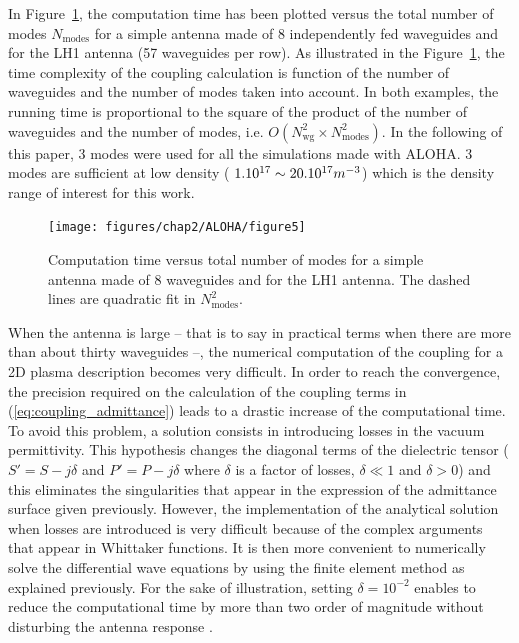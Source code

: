 In Figure~\ref{fig:Computation-time-versus-modes}, the computation time has been plotted versus the total number of modes $N_{\mbox{modes}}$ for a simple antenna made of 8 independently fed waveguides and for the LH1 antenna (57 waveguides per row). As illustrated in the Figure~\ref{fig:Computation-time-versus-modes}, the time complexity of the coupling calculation is function of the number of waveguides and the number of modes taken into account. In both examples, the running time is proportional to the square of the product of the number of waveguides and the number of modes, i.e. $O\left(N_{\mbox{wg}}^{2}\times N_{\mbox{modes}}^{2}\right)$. In the following of this paper, 3 modes were used for all the simulations made with ALOHA. 3 modes are sufficient at low density ( $1.10^{17}\sim20.10^{17}\mbox{\ensuremath{m^{-3}}}$)
which is the density range of interest for this work.

%
\begin{figure}[h]
	\texttt{[image: figures/chap2/ALOHA/figure5]}
	\caption{Computation time versus total number of modes for a simple antenna
		made of 8 waveguides and for the LH1 antenna. The dashed lines are
		quadratic fit in $N_{\mbox{modes}}^{2}$. \label{fig:Computation-time-versus-modes}}
\end{figure}


When the antenna is large -- that is to say in practical terms when there are more than about thirty waveguides --, the numerical computation of the coupling for a 2D plasma description becomes very difficult. In order to reach the convergence, the precision required on the calculation of the coupling terms in (\ref{eq:coupling_admittance}) leads to a drastic increase of the computational time. To avoid this problem, a solution consists in introducing losses in the vacuum permittivity. This hypothesis changes the diagonal terms of the dielectric tensor ($S'=S-j\delta$ and $P'=P-j\delta$ where $\delta$ is a factor of losses, $\delta\ll1$ and $\delta>0$) and this eliminates the singularities that appear in the expression of the admittance surface given previously. However, the implementation of the analytical solution when losses are introduced is very difficult because of the complex arguments that appear in Whittaker functions. It is then more convenient to numerically solve the differential wave equations by using the finite element method as explained previously. For the sake of illustration, setting $\delta=10^{-2}$ enables to reduce the computational time by more than two order of magnitude without disturbing the antenna response .


